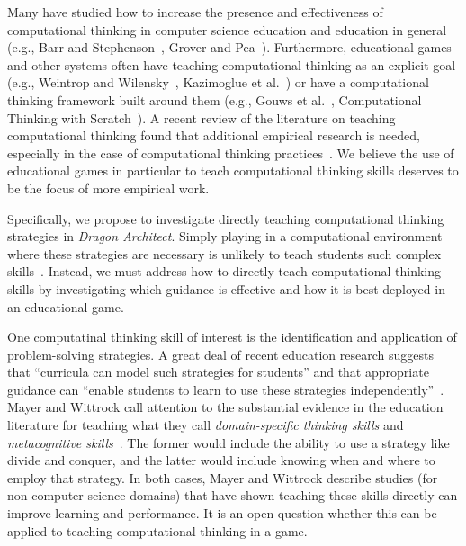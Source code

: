 \documentclass[conference]{IEEEtran}
\begin{document}
Many have studied how to increase the presence and effectiveness of computational thinking in computer science education and education in general (e.g., Barr and Stephenson~\cite{barr2011bringing}, Grover and Pea~\cite{grover2013computational}). 
Furthermore, educational games and other systems often have teaching computational thinking as an explicit goal (e.g., Weintrop and Wilensky~\cite{weintrop2013robobuilder},  Kazimoglue et al.~\cite{kazimoglu2012serious}) or have a computational thinking framework built around them (e.g., Gouws et al.~\cite{gouws2013lightbot}, Computational Thinking with Scratch~\cite{scratchedCT}).
A recent review of the literature on teaching computational thinking found that additional empirical research is needed, especially in the case of computational thinking practices~\cite{lye2014review}.
We believe the use of educational games in particular to teach computational thinking skills deserves to be the focus of more empirical work. 

Specifically, we propose to investigate directly teaching computational thinking strategies in \emph{Dragon Architect}. 
Simply playing in a computational environment where these strategies are necessary is unlikely to teach students such complex skills~\cite{mayer2004should}.
Instead, we must address how to directly teach computational thinking skills by investigating which guidance is effective and how it is best deployed in an educational game.

One computatinal thinking skill of interest is the identification and application of problem-solving strategies.
A great deal of recent education research suggests that ``curricula can model such strategies for students'' and that appropriate guidance can ``enable students to learn to use these strategies independently''~\cite{report2010computational}.
Mayer and Wittrock call attention to the substantial evidence in the education literature for teaching what they call \emph{domain-specific thinking skills} and \emph{metacognitive skills}~\cite{mayer1996handbook}.
The former would include the ability to use a strategy like divide and conquer, and the latter would include knowing when and where to employ that strategy.
In both cases, Mayer and Wittrock describe studies (for non-computer science domains) that have shown teaching these skills directly can improve learning and performance. 
It is an open question whether this can be applied to teaching computational thinking in a game.
\end{document}
